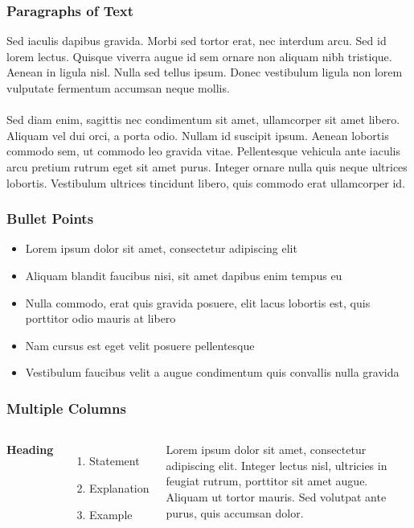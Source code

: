 \documentclass{beamer}
\begin{document}
\begin{frame}
  \frametitle{Paragraphs of Text}
  Sed iaculis dapibus gravida. Morbi sed tortor erat, nec interdum arcu. Sed id lorem lectus. Quisque viverra augue id sem ornare non aliquam nibh tristique. Aenean in ligula nisl. Nulla sed tellus ipsum. Donec vestibulum ligula non lorem vulputate fermentum accumsan neque mollis.\\~\\

  Sed diam enim, sagittis nec condimentum sit amet, ullamcorper sit
  amet libero. Aliquam vel dui orci, a porta odio. Nullam id suscipit
  ipsum. Aenean lobortis commodo sem, ut commodo leo gravida
  vitae. Pellentesque vehicula ante iaculis arcu pretium rutrum eget
  sit amet purus. Integer ornare nulla quis neque ultrices
  lobortis. Vestibulum ultrices tincidunt libero, quis commodo erat
  ullamcorper id.
\end{frame}


\begin{frame}
  \frametitle{Bullet Points}
  \begin{itemize}
  \item Lorem ipsum dolor sit amet, consectetur adipiscing elit
  \item Aliquam blandit faucibus nisi, sit amet dapibus enim tempus eu
  \item Nulla commodo, erat quis gravida posuere, elit lacus lobortis
    est, quis porttitor odio mauris at libero
  \item Nam cursus est eget velit posuere pellentesque
  \item Vestibulum faucibus velit a augue condimentum quis convallis
    nulla gravida
  \end{itemize}
\end{frame}


\begin{frame}
  \frametitle{Multiple Columns}

  \begin{columns}[c] %

    \textbf{Heading}
    \begin{enumerate}
    \item Statement
    \item Explanation
    \item Example
    \end{enumerate}

    Lorem ipsum dolor sit amet, consectetur adipiscing elit. Integer
    lectus nisl, ultricies in feugiat rutrum, porttitor sit amet
    augue. Aliquam ut tortor mauris. Sed volutpat ante purus, quis
    accumsan dolor.

  \end{columns}
\end{frame}
\end{document}
